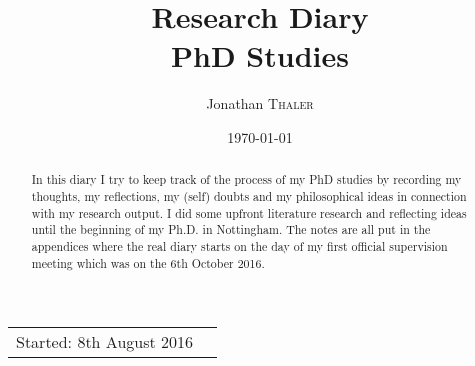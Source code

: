 \documentclass{article}
\title{Research Diary \\ PhD Studies} %
\author{Jonathan \textsc{Thaler}} %
\date{\today} %
\begin{document}
\maketitle %

\begin{center}
\begin{tabular}{l r}
Started: 8th August 2016
\end{tabular}
\end{center}

\begin{abstract}
In this diary I try to keep track of the process of my PhD studies by recording my thoughts, my reflections, my (self) doubts and my philosophical ideas in connection with my research output. I did some upfront literature research and reflecting ideas until the beginning of my Ph.D. in Nottingham. The notes are all put in the appendices where the real diary starts on the day of my first official supervision meeting which was on the 6th October 2016.
\end{abstract}







\newpage




\newpage

\appendix

\newpage


\newpage


\newpage

\end{document}
